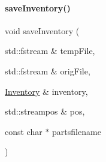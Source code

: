 \mbox{\label{main_8cpp_a0375d467e47b0258969791a9cb214150}} 
\paragraph{\texorpdfstring{saveInventory()}{saveInventory()}}
{\footnotesize\ttfamily void save\+Inventory (\begin{DoxyParamCaption}\item[{std\+::fstream \&}]{temp\+File,  }\item[{std\+::fstream \&}]{orig\+File,  }\item[{\mbox{\hyperlink{class_inventory}{Inventory}} \&}]{inventory,  }\item[{std\+::streampos \&}]{pos,  }\item[{const char $\ast$}]{partsfilename }\end{DoxyParamCaption})}

